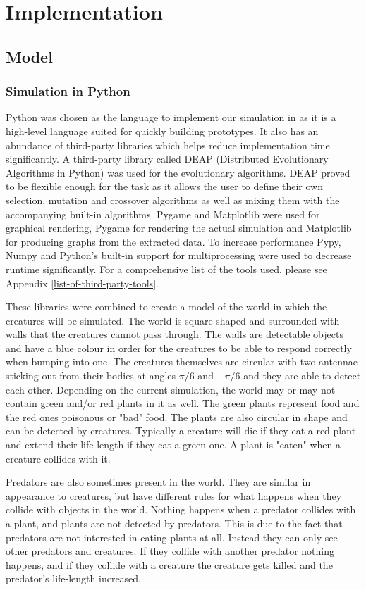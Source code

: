 \documentclass[a4paper,11pt]{kth-mag}
\begin{document}
\chapter{Implementation}
\section{Model}
\subsection{Simulation in Python}

Python was chosen as the language to implement our simulation in as it is a high-level language suited for quickly building prototypes. It also has an abundance of third-party libraries which helps reduce implementation time significantly. A third-party library called DEAP (Distributed Evolutionary Algorithms in Python) was used for the evolutionary algorithms. DEAP proved to be flexible enough for the task as it allows the user to define their own selection, mutation and crossover algorithms as well as mixing them with the accompanying built-in algorithms. Pygame and Matplotlib were used for graphical rendering, Pygame for rendering the actual simulation and Matplotlib for producing graphs from the extracted data. To increase performance Pypy, Numpy and Python's built-in support for multiprocessing were used to decrease runtime significantly. For a comprehensive list of the tools used, please see Appendix \ref{list-of-third-party-tools}.

These libraries were combined to create a model of the world in which the creatures will be simulated. The world is square-shaped and surrounded with walls that the creatures cannot pass through. The walls are detectable objects and have a blue colour in order for the creatures to be able to respond correctly when bumping into one. The creatures themselves are circular with two antennae sticking out from their bodies at angles $\pi /6$ and $-\pi/6$ and they are able to detect each other. Depending on the current simulation, the world may or may not contain green and/or red plants in it as well. The green plants represent food and the red ones poisonous or "bad" food. The plants are also circular in shape and can be detected by creatures. Typically a creature will die if they eat a red plant and extend their life-length if they eat a green one. A plant is "eaten" when a creature collides with it.

Predators are also sometimes present in the world. They are similar in appearance to creatures, but have different rules for what happens when they collide with objects in the world. Nothing happens when a predator collides with a plant, and plants are not detected by predators. This is due to the fact that predators are not interested in eating plants at all. Instead they can only see other predators and creatures. If they collide with another predator nothing happens, and if they collide with a creature the creature gets killed and the predator's life-length increased.
\end{document}
